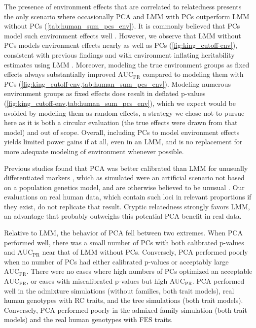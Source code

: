 \documentclass[11pt]{article}
\newcommand{\auc}{\text{AUC}_\text{PR}}
\begin{document}
\begin{linenumbers}
The presence of environment effects that are correlated to relatedness presents the only scenario where occasionally PCA and LMM with PCs outperform LMM without PCs (\cref{tab:human_sum_pcs_env}).
It is commonly believed that PCs model such environment effects well \citep{novembre_genes_2008, zhang_principal_2015, lin_admixed_2021}.
However, we observe that LMM without PCs models environment effects nearly as well as PCs (\cref{fig:king_cutoff-env}), consistent with previous findings \citep{vilhjalmsson_nature_2013, wang_trade-offs_2022} and with environment inflating heritability estimates using LMM \citep{heckerman_linear_2016}.
Moreover, modeling the true environment groups as fixed effects always substantially improved $\auc$ compared to modeling them with PCs (\cref{fig:king_cutoff-env,tab:human_sum_pcs_env}).
Modeling numerous environment groups as fixed effects does result in deflated p-values (\cref{fig:king_cutoff-env,tab:human_sum_pcs_env}), which we expect would be avoided by modeling them as random effects, a strategy we chose not to pursue here as it is both a circular evaluation (the true effects were drawn from that model) and out of scope.
Overall, including PCs to model environment effects yields limited power gains if at all, even in an LMM, and is no replacement for more adequate modeling of environment whenever possible.

Previous studies found that PCA was better calibrated than LMM for unusually differentiated markers \citep{price_new_2010, wu_comparison_2011, yang_advantages_2014}, which as simulated were an artificial scenario not based on a population genetics model, and are otherwise believed to be unusual \citep{sul_mixed_2013, price_response_2013}.
Our evaluations on real human data, which contain such loci in relevant proportions if they exist, do not replicate that result.
Cryptic relatedness strongly favors LMM, an advantage that probably outweighs this potential PCA benefit in real data.

Relative to LMM, the behavior of PCA fell between two extremes.
When PCA performed well, there was a small number of PCs with both calibrated p-values and $\auc$ near that of LMM without PCs.
Conversely, PCA performed poorly when no number of PCs had either calibrated p-values or acceptably large $\auc$.
There were no cases where high numbers of PCs optimized an acceptable $\auc$, or cases with miscalibrated p-values but high $\auc$.
PCA performed well in the admixture simulations (without families, both trait models), real human genotypes with RC traits, and the tree simulations (both trait models).
Conversely, PCA performed poorly in the admixed family simulation (both trait models) and the real human genotypes with FES traits.


\end{linenumbers}
\end{document}
